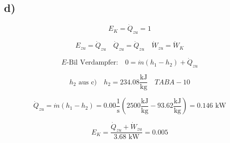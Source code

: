 

\subsection*{d)}

\[
E_K = \dot{Q}_{zu} = 1
\]

\[
E_{zu} = \dot{Q}_{zu} \quad \dot{Q}_{zu} = \dot{Q}_{zu} \quad \dot{W}_{zu} = \dot{W}_K
\]

\[
E\text{-Bil Verdampfer:} \quad 0 = \dot{m} (h_1 - h_2) + \dot{Q}_{zu}
\]

\[
h_2 \text{ aus c)} \quad h_2 = 234.08 \frac{\text{kJ}}{\text{kg}} \quad TAB A-10
\]

\[
\dot{Q}_{zu} = \dot{m} (h_1 - h_2) = 0.00 \frac{1}{\text{s}} (2500 \frac{\text{kJ}}{\text{kg}} - 93.62 \frac{\text{kJ}}{\text{kg}}) = 0.146 \text{ kW}
\]

\[
E_K = \frac{\dot{Q}_{zu} + \dot{W}_{zu}}{3.68 \text{ kW}} = 0.005
\]